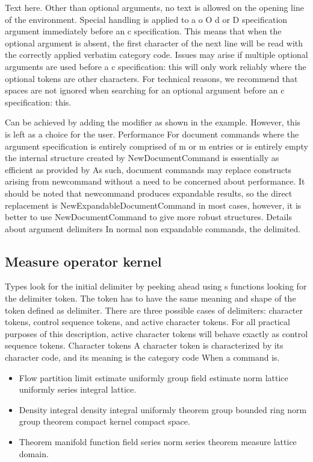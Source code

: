 \documentclass{article}
\begin{document}
Text here. Other than optional arguments, no text is allowed on the opening line of the environment. Special handling is applied to a o O d or D specification argument immediately before an c specification. This means that when the optional argument is absent, the first character of the next line will be read with the correctly applied verbatim category code. Issues may arise if multiple optional arguments are used before a c specification: this will only work reliably where the optional tokens are other characters. For technical reasons, we recommend that spaces are not ignored when searching for an optional argument before an c specification: this.

Can be achieved by adding the modifier as shown in the example. However, this is left as a choice for the user. Performance For document commands where the argument specification is entirely comprised of m or m entries or is entirely empty the internal structure created by NewDocumentCommand is essentially as efficient as provided by As such, document commands may replace constructs arising from newcommand without a need to be concerned about performance. It should be noted that newcommand produces expandable results, so the direct replacement is NewExpandableDocumentCommand in most cases, however, it is better to use NewDocumentCommand to give more robust structures. Details about argument delimiters In normal non expandable commands, the delimited.

\subsection{Measure operator kernel}
Types look for the initial delimiter by peeking ahead using s functions looking for the delimiter token. The token has to have the same meaning and shape of the token defined as delimiter. There are three possible cases of delimiters: character tokens, control sequence tokens, and active character tokens. For all practical purposes of this description, active character tokens will behave exactly as control sequence tokens. Character tokens A character token is characterized by its character code, and its meaning is the category code When a command is.
\begin{itemize}
\item Flow partition limit estimate uniformly group field estimate norm lattice uniformly series integral lattice.
\item Density integral density integral uniformly theorem group bounded ring norm group theorem compact kernel compact space.
\item Theorem manifold function field series norm series theorem measure lattice domain.
\end{itemize}
\end{document}
